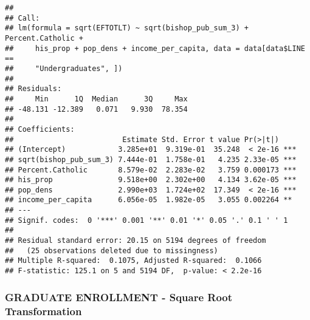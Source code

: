 \documentclass[]{article}
\newenvironment{Shaded}{\begin{snugshade}}{\end{snugshade}}
\newcommand{\KeywordTok}[1]{\textcolor[rgb]{0.13,0.29,0.53}{\textbf{#1}}}
\newcommand{\DataTypeTok}[1]{\textcolor[rgb]{0.13,0.29,0.53}{#1}}
\newcommand{\DecValTok}[1]{\textcolor[rgb]{0.00,0.00,0.81}{#1}}
\newcommand{\StringTok}[1]{\textcolor[rgb]{0.31,0.60,0.02}{#1}}
\newcommand{\OperatorTok}[1]{\textcolor[rgb]{0.81,0.36,0.00}{\textbf{#1}}}
\newcommand{\NormalTok}[1]{#1}
\begin{document}
\begin{verbatim}
## 
## Call:
## lm(formula = sqrt(EFTOTLT) ~ sqrt(bishop_pub_sum_3) + Percent.Catholic + 
##     his_prop + pop_dens + income_per_capita, data = data[data$LINE == 
##     "Undergraduates", ])
## 
## Residuals:
##     Min      1Q  Median      3Q     Max 
## -48.131 -12.389   0.071   9.930  78.354 
## 
## Coefficients:
##                         Estimate Std. Error t value Pr(>|t|)    
## (Intercept)            3.285e+01  9.319e-01  35.248  < 2e-16 ***
## sqrt(bishop_pub_sum_3) 7.444e-01  1.758e-01   4.235 2.33e-05 ***
## Percent.Catholic       8.579e-02  2.283e-02   3.759 0.000173 ***
## his_prop               9.518e+00  2.302e+00   4.134 3.62e-05 ***
## pop_dens               2.990e+03  1.724e+02  17.349  < 2e-16 ***
## income_per_capita      6.056e-05  1.982e-05   3.055 0.002264 ** 
## ---
## Signif. codes:  0 '***' 0.001 '**' 0.01 '*' 0.05 '.' 0.1 ' ' 1
## 
## Residual standard error: 20.15 on 5194 degrees of freedom
##   (25 observations deleted due to missingness)
## Multiple R-squared:  0.1075, Adjusted R-squared:  0.1066 
## F-statistic: 125.1 on 5 and 5194 DF,  p-value: < 2.2e-16
\end{verbatim}

\subsubsection{GRADUATE ENROLLMENT - Square Root
Transformation}\label{graduate-enrollment---square-root-transformation}

\begin{Shaded}
\end{Shaded}
\end{document}
